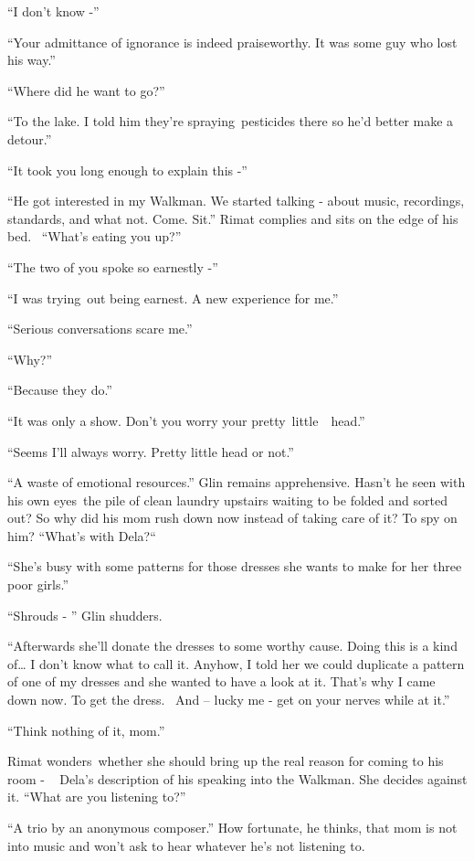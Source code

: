 \documentclass[twoside,11pt]{book}
\begin{document}
``I don't know -'' 

``Your admittance of ignorance is indeed praiseworthy. It was some guy who lost his way.'' 

``Where did he want to go?'' 

``To the lake. I told him they're spraying~pesticides there so he'd better make a detour.'' 

``It took you long enough to explain this -'' 

``He got interested in my Walkman. We started talking - about music, recordings, standards, and what not.
Come. Sit.'' Rimat complies and sits on the edge of his bed.~ ``What's eating you
up?'' 

``The two of you spoke so earnestly -'' 

``I was trying~out being earnest. A new experience for me.''

``Serious conversations scare me.'' 

``Why?'' 

``Because they do.'' 

``It was only a show. Don't you worry your pretty\ little\ \ head.''

``Seems I'll always worry. Pretty little head or not.'' 

``A waste of emotional resources.'' Glin remains apprehensive. Hasn't he seen with his own
eyes~the pile of clean laundry upstairs waiting to be folded and sorted out? So why did his mom rush down now instead
of taking care of it? To spy on him? ``What's with Dela?``~ 

``She's busy with some patterns for those dresses she wants to make for her three poor
girls.'' 

``Shrouds - '' Glin shudders. 

``Afterwards she'll donate the dresses to some worthy cause. Doing this is a kind of{\dots} I don't know
what to call it. Anyhow, I told her we could duplicate a pattern of one of my dresses and she wanted to have a look at
it. That's why I came down now. To get the dress. ~And -- lucky me - get on your nerves while at it.'' 

``Think nothing of it, mom.'' 

Rimat wonders~whether she should bring up the real reason for coming to his room - ~ Dela's description of his speaking
into the Walkman. She decides against it. ``What are you listening to?'' 

``A trio by an anonymous composer.'' How fortunate, he thinks, that mom is not into music and
won't ask to hear whatever he's  not listening to. 
\end{document}
